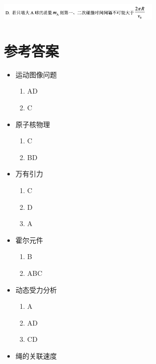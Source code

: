 \documentclass{article}
\begin{document}
\hspace{0.2em}\includegraphics[width = 0.6\textwidth]{./pictures/21-2.png}




\newpage

\section{参考答案}

\begin{minipage}{0.5\textwidth}
    \begin{itemize}
        \item 运动图像问题
              \begin{enumerate}
                  \item AD
                  \item C
              \end{enumerate}
        \item 原子核物理
              \begin{enumerate}
                  \item C
                  \item BD
              \end{enumerate}
        \item 万有引力
              \begin{enumerate}
                  \item C
                  \item D
                  \item A
              \end{enumerate}
        \item 霍尔元件
              \begin{enumerate}
                  \item B
                  \item ABC
              \end{enumerate}
        \item 动态受力分析
              \begin{enumerate}
                  \item A
                  \item AD
                  \item CD
              \end{enumerate}
        \item 绳的关联速度

\end{itemize}
\end{minipage}
\end{document}
